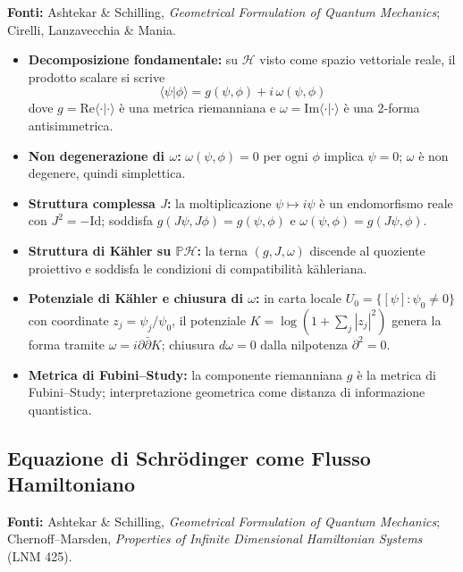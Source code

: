 \documentclass[12pt, a4paper]{article}
\newcommand{\fonti}[1]{%
	\begin{fontebox}
		\textcolor{fontecolor}{\footnotesize\textbf{Fonti:} #1}
	\end{fontebox}%
}
\begin{document}
	\fonti{Ashtekar \& Schilling, \textit{Geometrical Formulation of Quantum Mechanics};
		Cirelli, Lanzavecchia \& Mania.}
	
	\begin{itemize}
		\item \textbf{Decomposizione fondamentale:} su $\mathcal{H}$ visto come spazio
		vettoriale reale, il prodotto scalare si scrive
		\[
		\langle\psi|\phi\rangle = g(\psi,\phi) + i\,\omega(\psi,\phi)
		\]
		dove $g = \mathrm{Re}\langle\cdot|\cdot\rangle$ è una metrica riemanniana e
		$\omega = \mathrm{Im}\langle\cdot|\cdot\rangle$ è una 2-forma antisimmetrica.
		\item \textbf{Non degenerazione di $\omega$:} $\omega(\psi,\phi) = 0$ per ogni
		$\phi$ implica $\psi = 0$; $\omega$ è non degenere, quindi simplettica.
		\item \textbf{Struttura complessa $J$:} la moltiplicazione $\psi \mapsto i\psi$ è
		un endomorfismo reale con $J^2 = -\mathrm{Id}$; soddisfa
		$g(J\psi, J\phi) = g(\psi,\phi)$ e $\omega(\psi,\phi) = g(J\psi,\phi)$.
		\item \textbf{Struttura di Kähler su $\mathbb{P}\mathcal{H}$:} la terna $(g, J, \omega)$
		discende al quoziente proiettivo e soddisfa le condizioni di compatibilità kähleriana.
		\item \textbf{Potenziale di Kähler e chiusura di $\omega$:} in carta locale
		$U_0 = \{[\psi]: \psi_0 \neq 0\}$ con coordinate $z_j = \psi_j/\psi_0$, il
		potenziale $K = \log(1 + \sum_j|z_j|^2)$ genera la forma tramite
		$\omega = i\partial\bar\partial K$; chiusura $d\omega = 0$ dalla nilpotenza
		$\partial^2 = 0$.
		\item \textbf{Metrica di Fubini--Study:} la componente riemanniana $g$ è la metrica
		di Fubini--Study; interpretazione geometrica come distanza di informazione quantistica.
	\end{itemize}
	
	\subsection{Equazione di Schrödinger come Flusso Hamiltoniano}
	
	\fonti{Ashtekar \& Schilling, \textit{Geometrical Formulation of Quantum Mechanics}; Chernoff--Marsden, \textit{Properties of Infinite Dimensional Hamiltonian Systems} (LNM 425).}
	
\end{document}
